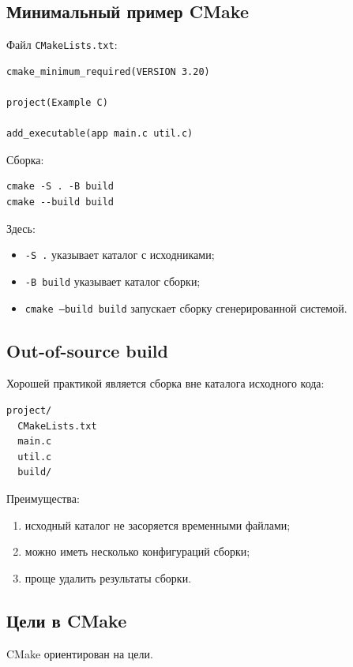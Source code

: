 \documentclass[12pt,a4paper]{article}
\begin{document}
\subsection{Минимальный пример CMake}

Файл \texttt{CMakeLists.txt}:

\begin{lstlisting}
cmake_minimum_required(VERSION 3.20)

project(Example C)

add_executable(app main.c util.c)
\end{lstlisting}

Сборка:

\begin{lstlisting}
cmake -S . -B build
cmake --build build
\end{lstlisting}

Здесь:
\begin{itemize}
    \item \texttt{-S .} указывает каталог с исходниками;
    \item \texttt{-B build} указывает каталог сборки;
    \item \texttt{cmake --build build} запускает сборку сгенерированной системой.
\end{itemize}

\subsection{Out-of-source build}

Хорошей практикой является сборка вне каталога исходного кода:

\begin{lstlisting}
project/
  CMakeLists.txt
  main.c
  util.c
  build/
\end{lstlisting}

Преимущества:
\begin{enumerate}
    \item исходный каталог не засоряется временными файлами;
    \item можно иметь несколько конфигураций сборки;
    \item проще удалить результаты сборки.
\end{enumerate}

\subsection{Цели в CMake}

CMake ориентирован на цели.
\end{document}
